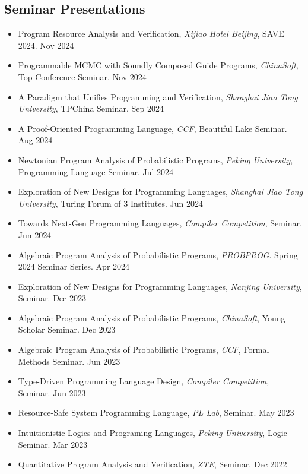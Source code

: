 \documentclass[11pt,letterpaper,sans]{moderncv}        %
\begin{document}
\subsection{Seminar Presentations}

\begin{itemize}
  \item {Program Resource Analysis and Verification}, \emph{Xijiao Hotel Beijing}, SAVE 2024. \hfill Nov 2024
  \item {Programmable MCMC with Soundly Composed Guide Programs}, \emph{ChinaSoft}, Top Conference Seminar. \hfill Nov 2024
  \item {A Paradigm that Unifies Programming and Verification}, \emph{Shanghai Jiao Tong University}, TPChina Seminar. \hfill Sep 2024
  \item {A Proof-Oriented Programming Language}, \emph{CCF}, Beautiful Lake Seminar. \hfill Aug 2024
  \item {Newtonian Program Analysis of Probabilistic Programs}, \emph{Peking University}, Programming Language Seminar. \hfill Jul 2024
  \item {Exploration of New Designs for Programming Languages}, \emph{Shanghai Jiao Tong University}, Turing Forum of 3 Institutes. \hfill Jun 2024
  \item {Towards Next-Gen Programming Languages}, \emph{Compiler Competition}, Seminar. \hfill Jun 2024
  \item {Algebraic Program Analysis of Probabilistic Programs}, \emph{PROBPROG}. Spring 2024 Seminar Series. \hfill Apr 2024
  \item {Exploration of New Designs for Programming Languages}, \emph{Nanjing University}, Seminar. \hfill Dec 2023
  \item {Algebraic Program Analysis of Probabilistic Programs}, \emph{ChinaSoft}, Young Scholar Seminar. \hfill Dec 2023
  \item {Algebraic Program Analysis of Probabilistic Programs}, \emph{CCF}, Formal Methods Seminar. \hfill Jun 2023
  \item {Type-Driven Programming Language Design}, \emph{Compiler Competition}, Seminar. \hfill Jun 2023
  \item {Resource-Safe System Programming Language}, \emph{PL Lab}, Seminar. \hfill May 2023
  \item {Intuitionistic Logics and Programing Languages}, \emph{Peking University}, Logic Seminar. \hfill Mar 2023
  \item {Quantitative Program Analysis and Verification}, \emph{ZTE}, Seminar. \hfill Dec 2022

\end{itemize}
\end{document}
